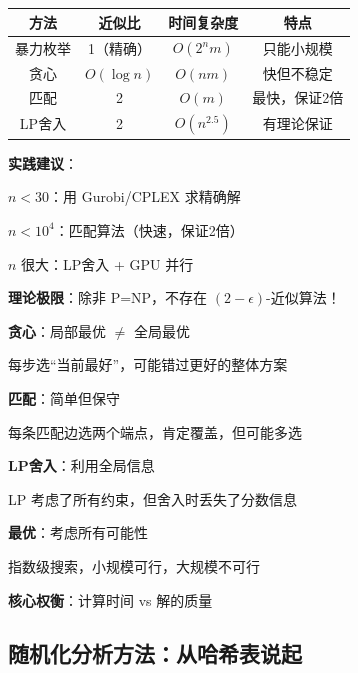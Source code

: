 \documentclass[12pt, a4paper]{ctexart}
\begin{document}
\begin{blackboard}

\begin{center}
\begin{tabular}{c|c|c|c}
方法 & 近似比 & 时间复杂度 & 特点 \\
\hline
暴力枚举 & 1（精确） & $O(2^n m)$ & 只能小规模 \\
贪心 & $O(\log n)$ & $O(nm)$ & 快但不稳定 \\
匹配 & 2 & $O(m)$ & 最快，保证2倍 \\
LP舍入 & 2 & $O(n^{2.5})$ & 有理论保证
\end{tabular}
\end{center}

\textbf{实践建议}：

$n < 30$：用 Gurobi/CPLEX 求精确解

$n < 10^4$：匹配算法（快速，保证2倍）

$n$ 很大：LP舍入 + GPU 并行

\textbf{理论极限}：除非 P=NP，不存在 $(2-\epsilon)$-近似算法！

\end{blackboard}

\begin{blackboard}[思考：为什么不同方法差这么多？]

\textbf{贪心}：局部最优 $\neq$ 全局最优

每步选``当前最好''，可能错过更好的整体方案

\textbf{匹配}：简单但保守

每条匹配边选两个端点，肯定覆盖，但可能多选

\textbf{LP舍入}：利用全局信息

LP 考虑了所有约束，但舍入时丢失了分数信息

\textbf{最优}：考虑所有可能性

指数级搜索，小规模可行，大规模不可行

\textbf{核心权衡}：计算时间 vs 解的质量

\end{blackboard}

\subsection{随机化分析方法：从哈希表说起}
\end{document}
